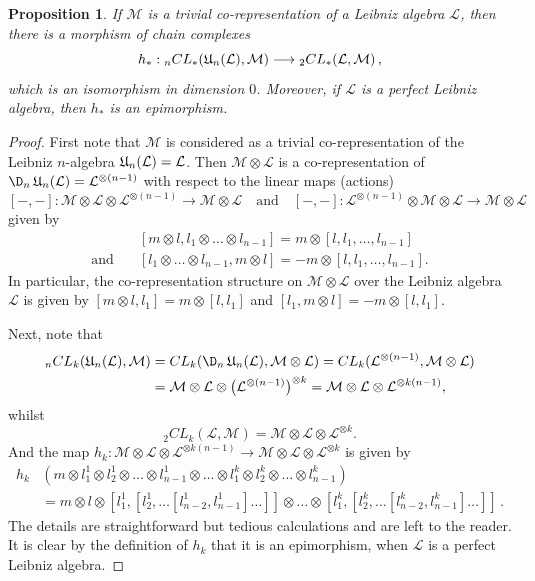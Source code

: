\documentclass[12pt, reqno]{amsart}
\newtheorem{proposition}[definition]{Proposition}
\newcommand{\lra}{\longrightarrow}
\def\U{\operatorname{\frak{U}}}
\begin{document}
\begin{proposition}\label{Prop homology complex }
If $\mathcal{M}$ is a trivial co-representation of a Leibniz algebra $\mathcal{L}$, then there is a morphism of chain complexes
\[
h_*: {}_{n}CL_*(\U_n(\mathcal{L}), \mathcal{M}) \lra {}_2CL_*(\mathcal{L}, \mathcal{M})\, ,
\]
 which is an isomorphism in dimension $0$.
Moreover, if  $\mathcal{L}$ is a perfect Leibniz algebra, then $h_*$ is an epimorphism.
\end{proposition}
\begin{proof}
First note that $\mathcal{M}$ is considered as a trivial co-representation of the Leibniz $n$-algebra $\U_n(\mathcal{L})=\mathcal{L}$.
Then $\mathcal{M}\otimes \mathcal{L}$ is a co-representation of $\D_n\U_n(\mathcal{L})=\mathcal{L}^{\otimes(n-1)}$ with respect to the linear maps (actions)
\[
[- , -]:\mathcal{M}\otimes \mathcal{L} \otimes \mathcal{L}^{\otimes(n-1)} \lra \mathcal{M}\otimes \mathcal{L} \quad \text{and} \quad
[- , -]: \mathcal{L}^{\otimes(n-1)} \otimes \mathcal{M}\otimes \mathcal{L} \lra \mathcal{M}\otimes \mathcal{L}
\]
given by
\begin{align*}
& [m\otimes l, l_1\otimes \dots \otimes l_{n-1}]= m\otimes [l, l_1, \dots, l_{n-1}]  \\
 \text{and} \quad &[l_1\otimes \dots \otimes l_{n-1}, m\otimes l] = - m\otimes [l, l_1, \dots, l_{n-1}].
\end{align*}
 In particular, the co-representation structure on $\mathcal{M}\otimes \mathcal{L}$ over the Leibniz algebra $\mathcal{L}$ is given by
 $[m\otimes l, l_1]=m\otimes [l, l_1]$ and $[l_1, m\otimes l] = - m\otimes [l, l_1]$.


Next, note that
\begin{align*}
{}_{n}CL_k(\U_n(\mathcal{L}), \mathcal{M}) &= CL_k(\D_n\U_n(\mathcal{L}), \mathcal{M}\otimes \mathcal{L}) = CL_k(\mathcal{L}^{\otimes(n-1)}, \mathcal{M}\otimes \mathcal{L}) \\
&= \mathcal{M}\otimes \mathcal{L} \otimes  \big({\mathcal{L}^{\otimes(n-1)}}\big)^{\otimes k} = \mathcal{M}\otimes \mathcal{L} \otimes {\mathcal{L}^{\otimes k(n-1)}},
\end{align*}
whilst
\[
{}_2CL_k(\mathcal{L}, \mathcal{M})=\mathcal{M}\otimes \mathcal{L}\otimes \mathcal{L}^{\otimes k}.
\]
And the map $h_k: \mathcal{M}\otimes \mathcal{L} \otimes {\mathcal{L}^{\otimes k(n-1)}} \lra \mathcal{M}\otimes \mathcal{L}\otimes \mathcal{L}^{\otimes k}$
is given by
\begin{align*}
h_k&(m\otimes l_1^1\otimes l_2^1 \otimes \dots \otimes l_{n-1}^1\otimes \dots\otimes l_1^k\otimes l_2^k \otimes \dots \otimes l_{n-1}^k)\\
&=m\otimes l \otimes [l_1^1, [l_2^1, \dots [l_{n-2}^1, l_{n-1}^1] \dots ]] \otimes \dots \otimes [l_1^k, [l_2^k, \dots [l_{n-2}^k, l_{n-1}^k] \dots ]] \, .
\end{align*}
The details are straightforward but tedious calculations and are left to the reader.
It is clear by the definition of $h_k$ that it is an epimorphism, when $\mathcal{L}$ is a perfect Leibniz algebra.
\end{proof}
\end{document}

